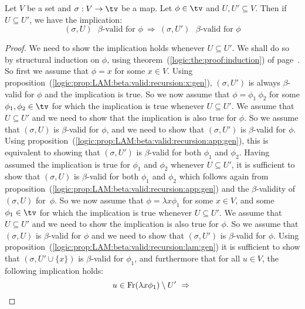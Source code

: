 \begin{prop}\label{logic:prop:LAM:beta:valid:monotone}
    Let $V$ be a set and $\sigma:V\to\tv$ be a map. Let $\phi\in\tv$ and
    $U,U'\subseteq V$. Then if $U\subseteq U'$, we have the implication:
        \[
            (\sigma,U)\mbox{\ $\beta$-valid for $\phi$}
            \ \Rightarrow\
            (\sigma,U')\mbox{\ $\beta$-valid for $\phi$}
        \]
\end{prop}
\begin{proof}
    We need to show the implication holds whenever $U\subseteq U'$. We shall 
    do so by structural induction on $\phi$, using 
    theorem~(\ref{logic:the:proof:induction}) of 
    page~\pageref{logic:the:proof:induction}. So first we assume that
    $\phi=x$ for some $x\in V$. Using
    proposition~(\ref{logic:prop:LAM:beta:valid:recursion:x:gen}), 
    $(\sigma,U')$ is always $\beta$-valid for $\phi$ and the implication
    is true. So we now assume that $\phi=\phi_{1}\ \phi_{2}$ for some
    $\phi_{1},\phi_{2}\in\tv$ for which the implication is true whenever
    $U\subseteq U'$. We assume that $U\subseteq U'$ and we need to show that 
    the implication is also true for $\phi$. So we assume that $(\sigma,U)$
    is $\beta$-valid for $\phi$, and we need to show that $(\sigma,U')$ is
    $\beta$-valid for $\phi$. Using
    proposition~(\ref{logic:prop:LAM:beta:valid:recursion:app:gen}), 
    this is equivalent to showing that $(\sigma,U')$ is $\beta$-valid
    for both $\phi_{1}$ and $\phi_{2}$. Having assumed the implication
    is true for $\phi_{1}$ and $\phi_{2}$ whenever $U\subseteq U'$, it is
    sufficient to show that $(\sigma,U)$ is $\beta$-valid for both
    $\phi_{1}$ and $\phi_{2}$ which follows again from
    proposition~(\ref{logic:prop:LAM:beta:valid:recursion:app:gen}) and
    the $\beta$-validity of $(\sigma,U)$ for~$\phi$.
    So we now assume that $\phi=\lambda x\phi_{1}$ for some $x\in V$, and 
    some $\phi_{1}\in\tv$ for which the implication is true whenever 
    $U\subseteq U'$. We assume that $U\subseteq U'$ and we need to show
    the implication is also true for $\phi$. So we assume that $(\sigma,U)$
    is $\beta$-valid for $\phi$ and we need to show that $(\sigma,U')$ is
    $\beta$-valid for $\phi$. Using
    proposition~(\ref{logic:prop:LAM:beta:valid:recursion:lam:gen}) it is
    sufficient to show that $(\sigma,U'\cup\{x\})$ is $\beta$-valid for 
    $\phi_{1}$, and furthermore that for all $u\in V$, the following 
    implication holds:
    \[
        u\in\mbox{\rm Fr}(\lambda x\phi_{1})\setminus U'
        \ \Rightarrow\ 
\]
\end{proof}
